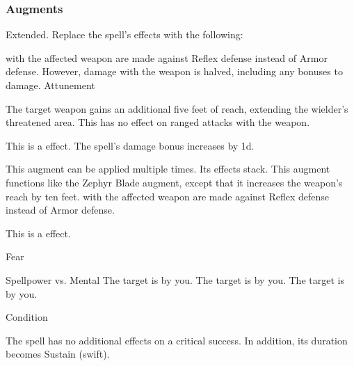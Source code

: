 \subsubsection{Augments}
 Extended.
Replace
the spell's effects with the following:
\begin{augmenteffects}
\spelleffect
{} with the affected weapon are made against Reflex defense instead of Armor defense.
However, damage with the weapon is halved, including any bonuses to damage.
\spelldur Attunement
\end{augmenteffects}
The target weapon gains an additional five feet of reach, extending the wielder's threatened area.
This has no effect on ranged attacks with the weapon.
\par
This is a  effect.
The spell's damage bonus increases by \plus1d.
\par
This augment can be applied multiple times.
Its effects stack.
This augment functions like the Zephyr Blade augment, except that it increases the weapon's reach by ten feet.
 with the affected weapon are made against Reflex defense instead of Armor defense.
\par
This is a  effect.
\begin{spellsection}{Fear}
\begin{spellheader}
\end{spellheader}
\begin{spellcontent}
\begin{spelltargetinginfo}
\end{spelltargetinginfo}
\begin{spelleffects}
\begin{spellattack}{Spellpower vs. Mental}
\spellsuccess The target is \frightened by you.
\spellcritical The target is \panicked by you.
\spellfailure The target is \shaken by you.
\end{spellattack}
\spelldur Condition
\end{spelleffects}
\end{spellcontent}
\begin{spellfooter}
\miscastexplode
\end{spellfooter}
\begin{spellcantrip}
The spell has no additional effects on a critical success.
In addition, its duration becomes Sustain (swift).
\end{spellcantrip}
\end{spellsection}
